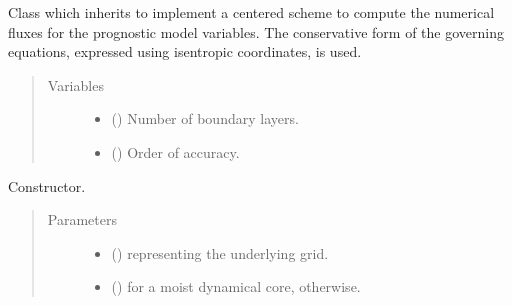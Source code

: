 \documentclass[letterpaper,10pt,english]{sphinxmanual}
\begin{document}
\begin{fulllineitems}
\label{\detokenize{api:tasmania.dycore.flux_isentropic_centered.FluxIsentropicCentered}}
Class which inherits  to implement a
centered scheme to compute the numerical fluxes for the prognostic model variables.
The conservative form of the governing equations, expressed using isentropic coordinates, is used.
\begin{quote}\begin{description}
\item[{Variables}] \leavevmode\begin{itemize}
\item {} 
{\hyperref[\detokenize{api:tasmania.dycore.prognostic_isentropic.PrognosticIsentropic.nb}]{}} () \textendash{} Number of boundary layers.

\item {} 
 () \textendash{} Order of accuracy.

\end{itemize}

\end{description}\end{quote}

\begin{fulllineitems}
\label{\detokenize{api:tasmania.dycore.flux_isentropic_centered.FluxIsentropicCentered.__init__}}
Constructor.
\begin{quote}\begin{description}
\item[{Parameters}] \leavevmode\begin{itemize}
\item {} 
 () \textendash{} {\hyperref[\detokenize{api:tasmania.grids.grid_xyz.GridXYZ}]{}} representing the underlying grid.

\item {} 
 () \textendash{}  for a moist dynamical core,  otherwise.


\end{itemize}
\end{description}
\end{quote}
\end{fulllineitems}
\end{fulllineitems}
\end{document}
